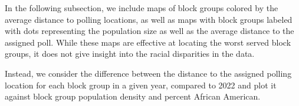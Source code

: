 \documentclass[11pt]{article}
\theoremstyle{remark}
\theoremstyle{definition}
\begin{document}
In the following subsection, we include maps of block groups colored by the average distance to polling locations, as well as maps with block groups labeled with dots representing the population size as well as the average distance to the assigned poll. While these maps are effective at locating the worst served block groups, it does not give insight into the racial disparities in the data. 

Instead, we consider the difference between the distance to the assigned polling location for each block group in a given year, compared to 2022 and plot it against block group population density and percent African American. 

\end{document}
